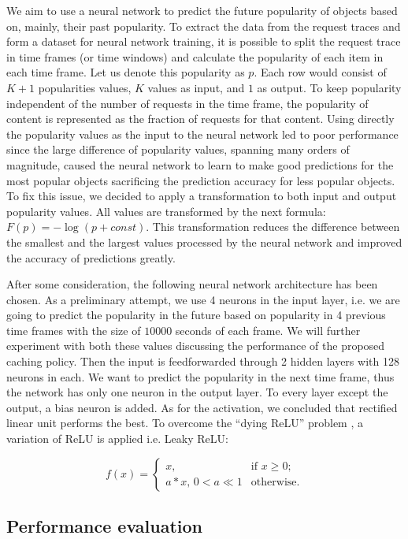 We aim to use a neural network to predict the future popularity of objects based on, mainly, their past popularity. To extract the data from the request traces and form a dataset for neural network training, it is possible to split the request trace in time frames (or time windows) and calculate the popularity of each item in each time frame. Let us denote this popularity as $ p $. Each row would consist of $ K + 1 $ popularities values, $K$ values as input, and $1$ as output. To keep popularity independent of the number of requests in the time frame, the popularity of content is represented as the fraction of requests for that content. Using directly the popularity values as the input to the neural network led to poor performance since the large difference of popularity values, spanning many orders of magnitude, caused the neural network to learn to make good predictions for the most popular objects sacrificing the prediction accuracy for less popular objects. To fix this issue, we decided to apply a transformation to both input and output popularity values. All values are transformed by the next formula: $ F(p) = -\log(p + const) $. This transformation reduces the difference between the smallest and the largest values processed by the neural network and improved the accuracy of predictions greatly.

After some consideration, the following neural network architecture has been chosen. As a preliminary attempt, we use 4 neurons in the input layer, i.e. we are going to predict the popularity in the future based on popularity in 4 previous time frames with the size of $10000$ seconds of each frame. We will further experiment with both these values discussing the performance of the proposed caching policy. Then the input is feedforwarded through 2 hidden layers with 128 neurons in each. We want to predict the popularity in the next time frame, thus the network has only one neuron in the output layer. To every layer except the output, a bias neuron is added. As for the activation, we concluded that rectified linear unit performs the best. To overcome the ``dying ReLU'' problem \cite{14}, a variation of ReLU is applied i.e. Leaky ReLU:

$$ f(x) = 
	\begin{cases}
	x, & \text{if } x \geq 0; \\
	a*x,\, 0 < a \ll 1 & \text{otherwise.}
	\end{cases}
$$

\subsection{Performance evaluation} \label{performance_eval}

